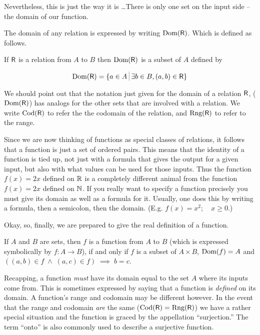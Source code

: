 Nevertheless, this is just the way it is \ldots  There is only one
set on the input side -- the domain of our function. 

The domain of
any relation is expressed by writing $\mbox{Dom}(\mbox{\textsf R})$. Which is 
defined as follows.

\begin{defi}
If $\mbox{\textsf R}$ is a relation from $A$ to $B$ then $\mbox{Dom}(\mbox{\textsf R})$ is
a subset of $A$ defined by

\[ \Dom{\relR} = \{a \in A \suchthat \exists b \in B, (a,b) \in \relR \} 
\]

\end{defi}

We should point out that the notation just given for the domain of a 
relation $\mbox{\textsf R}$, ($\mbox{Dom}(\mbox{\textsf R})$) has analogs for the other 
sets that are involved with a relation.  We write $\mbox{Cod}(\mbox{\textsf R})$
to refer the the codomain of the relation, and $\mbox{Rng}(\mbox{\textsf R})$
to refer to the range. 

Since we are now thinking of functions as special classes of relations, it follows that a function is just 
a set of ordered pairs.  This means that the identity of a function is
tied up, not just with a formula that gives the output for a given input,
but also with what values can be used for those inputs.   Thus the function
$f(x)=2x$ defined on ${\mathbb R}$ is a completely different animal from 
the function $f(x)=2x$ defined on ${\mathbb N}$.  If you really want to
specify a function precisely you must give its domain as well as a 
formula for it.  Usually, one does this by writing a formula, then a 
semicolon, then the domain.  (E.g. $f(x)=x^2; \quad x \geq 0$.)

Okay, so, finally, we are prepared to give the real
definition of a function.

\begin{defi}
If $A$ and $B$ are sets, then $f$ is a function from $A$ to $B$ (which
is expressed symbolically by $f:A\longrightarrow B$), if and only if
$f$ is a subset of $A\times B$, $\mbox{Dom}(f)=A$ and $((a,b) \in f \; \land \; (a,c) \in f) \; \implies \; b=c$.
\end{defi}

Recapping, a function \emph{must} have its domain equal to the set $A$
where its inputs come from.  This is sometimes expressed by saying that
a function is \emph{defined} on its domain.  A function's range and codomain
may be different however.  In the event that the range and codomain \emph{are}
the same ($\mbox{Cod}(\mbox{\textsf R}) = \mbox{Rng}(\mbox{\textsf R})$)
we have a rather special situation and the function is graced by
the appellation ``surjection.''  The term ``onto'' is also commonly used
to describe a surjective function.  


